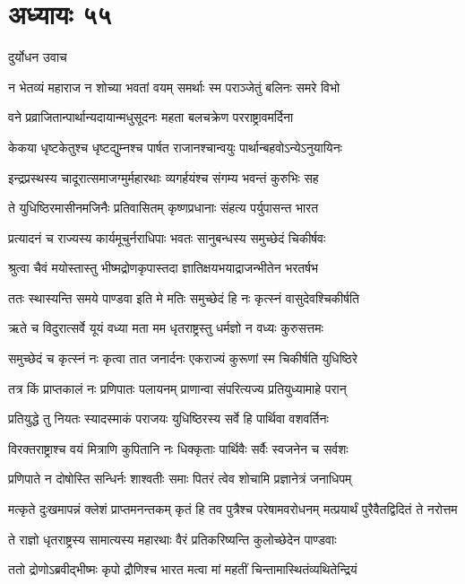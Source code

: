 \chapter{अध्यायः ५५}
\twolineshloka
{दुर्योधन उवाच}
{}


\twolineshloka
{न भेतव्यं महाराज न शोच्या भवतां वयम्}
{समर्थाः स्म पराञ्जेतुं बलिनः समरे विभो}


\twolineshloka
{वने प्रव्राजितान्पार्थान्यदायान्मधुसूदनः}
{महता बलचक्रेण परराष्ट्रावमर्दिना}


\twolineshloka
{केकया धृष्टकेतुश्च धृष्टद्युम्नश्च पार्षत}
{राजानश्चान्वयुः पार्थान्बहवोऽन्येऽनुयायिनः}


\twolineshloka
{इन्द्रप्रस्थस्य चादूरात्समाजग्मुर्महारथाः}
{व्यगर्हयंश्च संगम्य भवन्तं कुरुभिः सह}


\twolineshloka
{ते युधिष्ठिरमासीनमजिनैः प्रतिवासितम्}
{कृष्णप्रधानाः संहत्य पर्युपासन्त भारत}


\twolineshloka
{प्रत्यादनं च राज्यस्य कार्यमूचुर्नराधिपाः}
{भवतः सानुबन्धस्य समुच्छेदं चिकीर्षवः}


\twolineshloka
{श्रुत्वा चैवं मयोस्तास्तु भीष्मद्रोणकृपास्तदा}
{ज्ञातिक्षयभयाद्राजन्भीतेन भरतर्षभ}


\twolineshloka
{ततः स्थास्यन्ति समये पाण्डवा इति मे मतिः}
{समुच्छेदं हि नः कृत्स्नं वासुदेवश्चिकीर्षति}


\twolineshloka
{ऋते च विदुरात्सर्वे यूयं वध्या मता मम}
{धृतराष्ट्रस्तु धर्मज्ञो न वध्यः कुरुसत्तमः}


\twolineshloka
{समुच्छेदं च कृत्स्नं नः कृत्वा तात जनार्दनः}
{एकराज्यं कुरूणां स्म चिकीर्षति युधिष्ठिरे}


\twolineshloka
{तत्र किं प्राप्तकालं नः प्रणिपातः पलायनम्}
{प्राणान्वा संपरित्यज्य प्रतियुध्यामाहे परान्}


\twolineshloka
{प्रतियुद्धे तु नियतः स्यादस्माकं पराजयः}
{युधिष्ठिरस्य सर्वे हि पार्थिवा वशवर्तिनः}


\twolineshloka
{विरक्तराष्ट्राश्च वयं मित्राणि कुपितानि नः}
{धिक्कृताः पार्थिवैः सर्वैः स्वजनेन च सर्वशः}


\twolineshloka
{प्रणिपाते न दोषोस्ति सन्धिर्नः शाश्वतीः समाः}
{पितरं त्वेव शोचामि प्रज्ञानेत्रं जनाधिपम्}


\threelineshloka
{मत्कृते दुःखमापन्नं क्लेशं प्राप्तमनन्तकम्}
{कृतं हि तव पुत्रैश्च परेषामवरोधनम्}
{मत्प्रयार्थं पुरैवैतद्विदितं ते नरोत्तम}


\twolineshloka
{ते राज्ञो धृतराष्ट्रस्य सामात्यस्य महारथाः}
{वैरं प्रतिकरिष्यन्ति कुलोच्छेदेन पाण्डवाः}


\twolineshloka
{ततो द्रोणोऽब्रवीद्भीष्मः कृपो द्रौणिश्च भारत}
{मत्वा मां महतीं चिन्तामास्थितंव्यथितेन्द्रियं}


